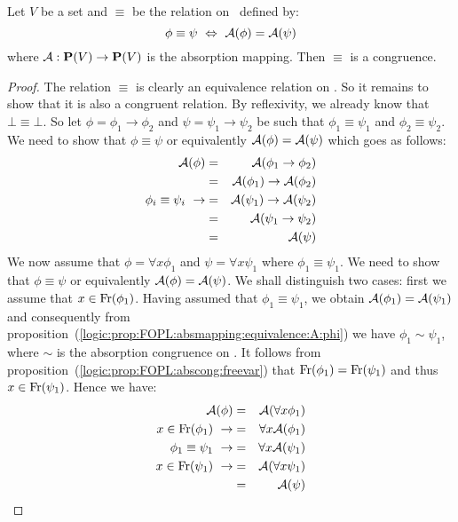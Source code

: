 \begin{prop}\label{logic:prop:FOPL:absmapping:congruence}
Let $V$ be a set and $\equiv$ be the relation on \pv\ defined by:
    \[
    \phi\equiv\psi\ \Leftrightarrow\ {\cal A}(\phi)={\cal A}(\psi)
    \]
where ${\cal A}:\mbox{${\bf P}(V)$}\to\mbox{${\bf P}(V)$}$ is the absorption mapping. Then $\equiv$
is a congruence.
\end{prop}
\begin{proof}
The relation $\equiv$ is clearly an equivalence relation on \pv. So
it remains to show that it is also a congruent relation. By
reflexivity, we already know that $\bot\equiv\bot$. So let
$\phi=\phi_{1}\to\phi_{2}$ and $\psi=\psi_{1}\to\psi_{2}$ be such
that $\phi_{1}\equiv\psi_{1}$ and $\phi_{2}\equiv\psi_{2}$. We need
to show that $\phi\equiv\psi$ or equivalently ${\cal A}(\phi)={\cal
A}(\psi)$ which goes as follows:
    \begin{eqnarray*}
    {\cal A}(\phi)&=&{\cal A}(\phi_{1}\to\phi_{2})\\
    &=&{\cal A}(\phi_{1})\to{\cal A}(\phi_{2})\\
    \phi_{i}\equiv\psi_{i}\ \rightarrow
    &=&{\cal A}(\psi_{1})\to{\cal A}(\psi_{2})\\
    &=&{\cal A}(\psi_{1}\to\psi_{2})\\
    &=&{\cal A}(\psi)
    \end{eqnarray*}
We now assume that $\phi=\forall x\phi_{1}$ and $\psi=\forall
x\psi_{1}$ where $\phi_{1}\equiv\psi_{1}$. We need to show that
$\phi\equiv\psi$ or equivalently ${\cal A}(\phi)={\cal A}(\psi)$. We
shall distinguish two cases: first we assume that
$x\in\mbox{\rm Fr}(\phi_{1})$. Having assumed that $\phi_{1}\equiv\psi_{1}$,
we obtain ${\cal A}(\phi_{1})={\cal A}(\psi_{1})$ and consequently
from
proposition~(\ref{logic:prop:FOPL:absmapping:equivalence:A:phi}) we
have $\phi_{1}\sim\psi_{1}$, where $\sim$ is the absorption
congruence on \pv. It follows from
proposition~(\ref{logic:prop:FOPL:abscong:freevar}) that
$\mbox{\rm Fr}(\phi_{1})=\mbox{\rm Fr}(\psi_{1})$ and thus $x\in\mbox{\rm Fr}(\psi_{1})$.
Hence we have:
    \begin{eqnarray*}
    {\cal A}(\phi)&=&{\cal A}(\forall x\phi_{1})\\
    x\in\mbox{\rm Fr}(\phi_{1})\ \rightarrow
    &=&\forall x{\cal A}(\phi_{1})\\
    \phi_{1}\equiv\psi_{1}\ \rightarrow
    &=&\forall x{\cal A}(\psi_{1})\\
    x\in\mbox{\rm Fr}(\psi_{1})\ \rightarrow
    &=&{\cal A}(\forall x\psi_{1})\\
    &=&{\cal A}(\psi)
    \end{eqnarray*}

\end{proof}

